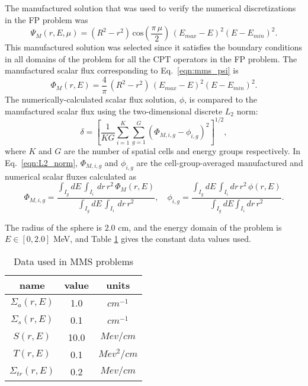 \documentclass[../main.tex]{subfiles}
\begin{document}
The manufactured solution that was used to verify the numerical discretizations in the FP problem was
\begin{equation} \label{eqn:mms_psi}
  \Psi_M(r,E,\mu) = \left( R^2 - r^2 \right) \, \text{cos}\left(\frac{\pi \, \mu}{2}\right) \, \left(E_{max} - E\right)^2 \left(E - E_{min}\right)^2.
\end{equation}
This manufactured solution was selected since it satisfies the boundary conditions in all domains of the problem for all the CPT operators in the FP problem. The manufactured scalar flux corresponding to Eq.~\eqref{eqn:mms_psi} is
\begin{equation}
  \Phi_M(r,E) = \dfrac{4}{\pi} \, \left( R^2 - r^2 \right) \, \left(E_{max} - E\right)^2 \left(E - E_{min}\right)^2.
\end{equation}
The numerically-calculated scalar flux solution, $\phi$, is compared to the manufactured scalar flux using the two-dimensional discrete $L_2$ norm:
\begin{equation} \label{eqn:L2_norm}
  \delta = \left[ \dfrac{1}{K G} \sum_{i=1}^K \sum_{g=1}^G \left(\Phi_{M,i,g} - \phi_{i,g} \right)^2 \right]^{1/2},
\end{equation}
where $K$ and $G$ are the number of spatial cells and energy groups respectively. In Eq.~\eqref{eqn:L2_norm}, $\Phi_{M,i,g}$ and $\phi_{i,g}$ are the cell-group-averaged manufactured and numerical scalar fluxes calculated as
\begin{equation}
  \Phi_{M,i,g} = \frac{ \int_{I_g} dE \, \int_{I_i} \, dr \, r^2 \, \Phi_M(r,E) }{ \int_{I_g} dE \, \int_{I_i} \, dr \, r^2  }, \quad \phi_{i,g} = \frac{ \int_{I_g} dE \, \int_{I_i} dr \, r^2 \, \phi(r,E) }{ \int_{I_g} dE \int_{I_i} dr \, r^2 }.
\end{equation}

The radius of the sphere is $2.0$ cm, and the energy domain of the problem is $E \in [0, 2.0]$ MeV, and Table \ref{tab:MMS_data} gives the constant data values used.
\begin{table}[!htb]
  \centering
  \caption{Data used in MMS problems}
  \label{tab:MMS_data}
  \begin{tabular}{c|c|c}
  \toprule[2pt]
  name       & value & units      \\
  \midrule[2pt]
  $\Sigma_a(r,E)$ & 1.0  & $cm^{-1}$  \\
  $\Sigma_s(r,E)$ & 0.1  & $cm^{-1}$  \\
  $S(r,E)$  & 10.0  & $Mev/cm$   \\
  $T(r,E)$  & 0.1   & $Mev^2/cm$ \\
  $\Sigma_{tr}(r,E)$  & 0.2   & $Mev/cm$   \\
  \bottomrule[2pt]
  \end{tabular}
\end{table}
\end{document}
